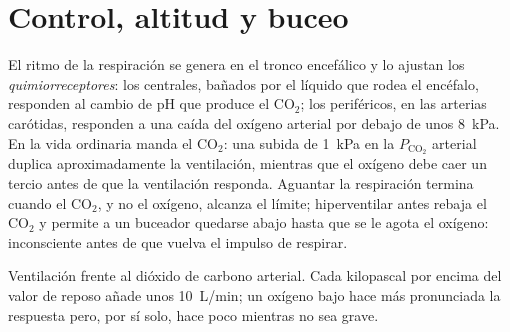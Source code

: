 \section{Control, altitud y buceo}

\begin{proposition}\label{prop:b1:gas-exchange:control}
El ritmo de la respiración se genera en el tronco encefálico y lo ajustan
los \emph{quimiorreceptores}: los centrales, bañados por el líquido que
rodea el encéfalo, responden al cambio de pH que produce el
$\mathrm{CO_2}$; los periféricos, en las arterias carótidas, responden a una
caída del oxígeno arterial por debajo de unos \qty{8}{kPa}. En la vida
ordinaria manda el $\mathrm{CO_2}$: una subida de \qty{1}{kPa} en la
$P_{\mathrm{CO_2}}$ arterial duplica aproximadamente la ventilación,
mientras que el oxígeno debe caer un tercio antes de que la ventilación
responda. Aguantar la respiración termina cuando el $\mathrm{CO_2}$, y no el
oxígeno, alcanza el límite; hiperventilar antes rebaja el $\mathrm{CO_2}$ y
permite a un buceador quedarse abajo hasta que se le agota el oxígeno:
inconsciente antes de que vuelva el impulso de respirar.
\end{proposition}

\begin{omfigure}

{\small Ventilación frente al dióxido de carbono arterial. Cada kilopascal
por encima del valor de reposo añade unos \qty{10}{L/min}; un oxígeno bajo
hace más pronunciada la respuesta pero, por sí solo, hace poco mientras no
sea grave.}
\end{omfigure}

